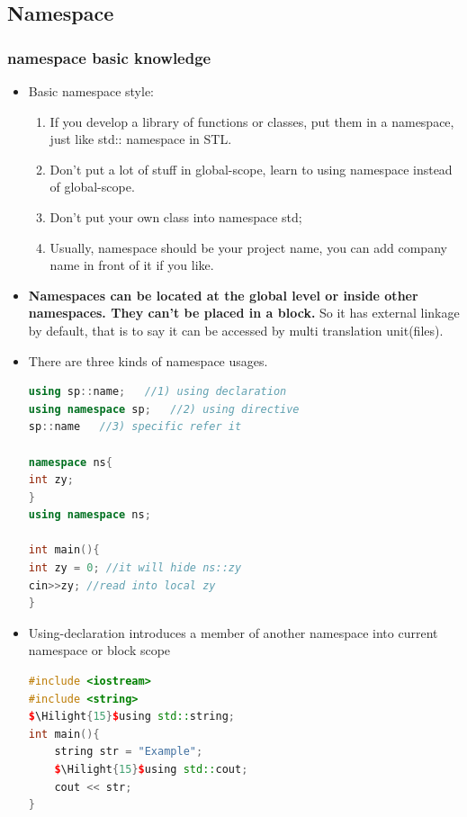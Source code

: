 \documentclass[a4paper,12pt,twoside]{book}
\newcommand{\Hilight}[1]{\makebox[0pt][l]{\color{yellow}\rule[-3pt]{#1em}{11pt}}}
\begin{document}
\subsection{Namespace}
\subsubsection{namespace basic knowledge}
\begin{itemize}

\item Basic namespace style:
\begin{enumerate}
\item If you develop a library of functions or classes, put them in a namespace, just like std:: namespace in STL.

\item Don't put a lot of stuff in global-scope, learn to using namespace instead of global-scope.

\item Don't put your own class into namespace std;

\item Usually, namespace should be your project name, you can add company name in front of it if you like.
\end{enumerate}



\item \textbf{Namespaces can be located at the global level or inside other namespaces. They can't be placed in a block.} So it has external linkage by default, that is to say it can be accessed by multi translation unit(files).


\item There are three kinds of namespace usages.
\begin{lstlisting}[frame=single, language=c++]
using sp::name;   //1) using declaration
using namespace sp;   //2) using directive
sp::name   //3) specific refer it

namespace ns{
int zy;
}
using namespace ns;

int main(){
int zy = 0; //it will hide ns::zy
cin>>zy; //read into local zy
}
\end{lstlisting}

\item Using-declaration introduces a member of another namespace into current namespace or block scope

\begin{lstlisting}[frame=single, language=c++]
#include <iostream>
#include <string>
$\Hilight{15}$using std::string;
int main(){
    string str = "Example";
    $\Hilight{15}$using std::cout;
    cout << str;
}
\end{lstlisting}



\end{itemize}
\end{document}
